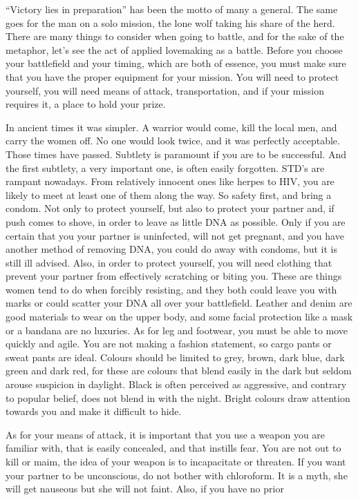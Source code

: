 “Victory lies in preparation” has been the motto of many a general. The same 
goes for the man on a solo mission, the lone wolf taking his share of the herd. 
There are many things to consider when going to battle, and for the sake of the 
metaphor, let's see the act of applied lovemaking as a battle. Before you choose 
your battlefield and your timing, which are both of essence, you must make sure 
that you have the proper equipment for your mission. You will need to protect 
yourself, you will need means of attack, transportation, and if your mission 
requires it, a place to hold your prize.


In ancient times it was simpler. A warrior would come, kill the local men, and 
carry the women off. No one would look twice, and it was perfectly acceptable. 
Those times have passed. Subtlety is paramount if you are to be successful. And 
the first subtlety, a very important one, is often easily forgotten. STD's are 
rampant nowadays. From relatively innocent ones like herpes to HIV, you are 
likely to meet at least one of them along the way. So safety first, and bring a 
condom. Not only to protect yourself, but also to protect your partner and, if 
push comes to shove, in order to leave as little DNA as possible. Only if you 
are certain that you your partner is uninfected, will not get pregnant, and you 
have another method of removing DNA, you could do away with condoms, but it is 
still ill advised. Also, in order to protect yourself, you will need clothing 
that prevent your partner from effectively scratching or biting you. These are 
things women tend to do when forcibly resisting, and they both could leave you 
with marks or could scatter your DNA all over your battlefield. Leather and 
denim are good materials to wear on the upper body, and some facial protection 
like a mask or a bandana are no luxuries. As for leg and footwear, you must be 
able to move quickly and agile. You are not making a fashion statement, so cargo 
pants or sweat pants are ideal. Colours should be limited to grey, brown, dark 
blue, dark green and dark red, for these are colours that blend easily in the 
dark but seldom arouse suspicion in daylight. Black is often perceived as 
aggressive, and contrary to popular belief, does not blend in with the night. 
Bright colours draw attention towards you and make it difficult to hide.


As for your means of attack, it is important that you use a weapon you are 
familiar with, that is easily concealed, and that instills fear. You are not out 
to kill or maim, the idea of your weapon is to incapacitate or threaten. If you 
want your partner to be unconscious, do not bother with chloroform. It is a 
myth, she will get nauseous but she will not faint. Also, if you have no prior


